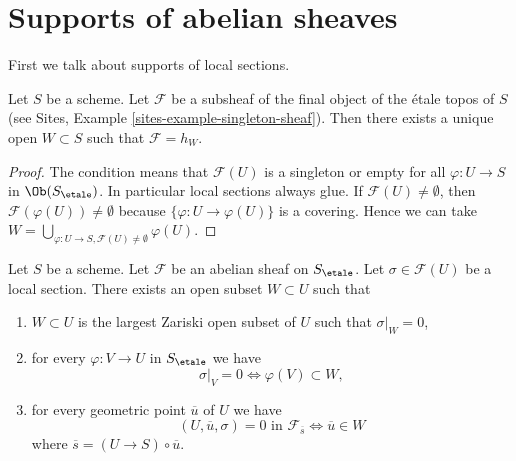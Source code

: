 \section{Supports of abelian sheaves}
\label{section-support}

\noindent
First we talk about supports of local sections.

\begin{lemma}
\label{lemma-support-subsheaf-final}
Let $S$ be a scheme. Let $\mathcal{F}$ be a subsheaf of the final
object of the \'etale topos of $S$ (see
Sites, Example \ref{sites-example-singleton-sheaf}).
Then there exists a unique open
$W \subset S$ such that $\mathcal{F} = h_W$.
\end{lemma}

\begin{proof}
The condition means that $\mathcal{F}(U)$ is a singleton or
empty for all $\varphi : U \to S$ in $\Ob(S_\etale)$.
In particular local sections always glue. If
$\mathcal{F}(U) \not = \emptyset$, then
$\mathcal{F}(\varphi(U)) \not = \emptyset$ because
$\{\varphi : U \to \varphi(U)\}$ is a covering.
Hence we can take
$W = \bigcup_{\varphi : U \to S, \mathcal{F}(U) \not = \emptyset} \varphi(U)$.
\end{proof}

\begin{lemma}
\label{lemma-zero-over-image}
Let $S$ be a scheme.
Let $\mathcal{F}$ be an abelian sheaf on $S_\etale$.
Let $\sigma \in \mathcal{F}(U)$ be a local section.
There exists an open subset $W \subset U$ such that
\begin{enumerate}
\item $W \subset U$ is the largest Zariski open subset of $U$ such
that $\sigma|_W = 0$,
\item for every $\varphi : V \to U$ in $S_\etale$ we have
$$
\sigma|_V = 0 \Leftrightarrow \varphi(V) \subset W,
$$
\item for every geometric point $\overline{u}$ of $U$ we have
$$
(U, \overline{u}, \sigma) = 0\text{ in }\mathcal{F}_{\overline{s}}
\Leftrightarrow
\overline{u} \in W
$$
where $\overline{s} = (U \to S) \circ \overline{u}$.
\end{enumerate}
\end{lemma}

